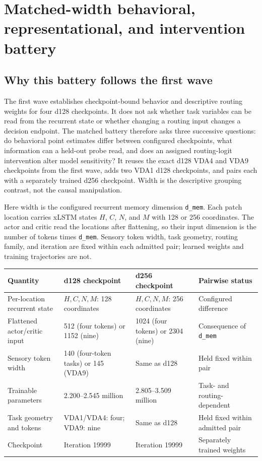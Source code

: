 \documentclass[11pt,a4paper]{article}
\begin{document}
\section{Matched-width behavioral, representational, and intervention battery}
\subsection{Why this battery follows the first wave}
The first wave establishes checkpoint-bound behavior and descriptive routing weights for four d128 checkpoints. It does not ask whether task variables can be read from the recurrent state or whether changing a routing input changes a decision endpoint. The matched battery therefore asks three successive questions: do behavioral point estimates differ between configured checkpoints, what information can a held-out probe read, and does an assigned routing-logit intervention alter model sensitivity? It reuses the exact d128 VDA4 and VDA9 checkpoints from the first wave, adds two VDA1 d128 checkpoints, and pairs each with a separately trained d256 checkpoint. Width is the descriptive grouping contrast, not the causal manipulation.

Here width is the configured recurrent memory dimension \texttt{d\_mem}. Each patch location carries xLSTM states $H$, $C$, $N$, and $M$ with 128 or 256 coordinates. The actor and critic read the locations after flattening, so their input dimension is the number of tokens times \texttt{d\_mem}. Sensory token width, task geometry, routing family, and iteration are fixed within each admitted pair; learned weights and training trajectories are not.

\begingroup\small
{}\label{tab:width-comparison}
\begin{tabularx}{\textwidth}{@{}p{4.0cm}Y Y Y@{}}
\toprule
Quantity & d128 checkpoint & d256 checkpoint & Pairwise status\\
\midrule
Per-location recurrent state & $H,C,N,M$: 128 coordinates & $H,C,N,M$: 256 coordinates & Configured difference\\
Flattened actor/critic input & 512 (four tokens) or 1152 (nine) & 1024 (four tokens) or 2304 (nine) & Consequence of \texttt{d\_mem}\\
Sensory token width & 140 (four-token tasks) or 145 (VDA9) & Same as d128 & Held fixed within pair\\
Trainable parameters & 2.200--2.545 million & 2.805--3.509 million & Task- and routing-dependent\\
Task geometry and tokens & VDA1/VDA4: four; VDA9: nine & Same as d128 & Held fixed within admitted pair\\
Checkpoint & Iteration 19999 & Iteration 19999 & Separately trained weights\\
\bottomrule
\end{tabularx}
\endgroup
\end{document}
